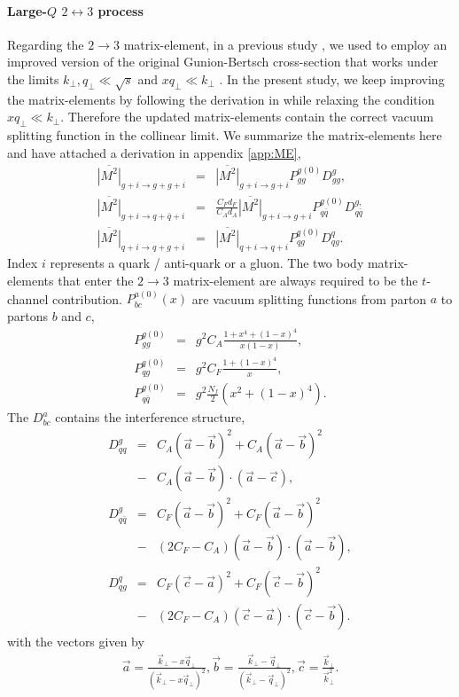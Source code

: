 \paragraph{Large-$Q$ $2\leftrightarrow 3$ process} 
Regarding the $2\rightarrow 3$ matrix-element, in a previous study \cite{Ke:2018tsh}, we used to employ an improved version of the original Gunion-Bertsch cross-section that works under the limits $k_\perp, q_\perp \ll \sqrt{s}$ and $x q_\perp \ll k_\perp$ \cite{PhysRevD.25.746,Fochler:2013epa,Uphoff:2014hza}.
In the present study, we keep improving the matrix-elements by following the derivation in \cite{Fochler:2013epa} while relaxing the condition $x q_\perp \ll k_\perp$.
Therefore the updated matrix-elements contain the correct vacuum splitting function in the collinear limit.
We summarize the matrix-elements here and have attached a derivation in appendix \ref{app:ME},
\begin{eqnarray}
\overline{|M^2|}_{g+i\rightarrow g+g+i} &=& \overline{|M^2|}_{g+i\rightarrow g+i} P_{gg}^{g(0)}  D_{gg}^{g},\\
\overline{|M^2|}_{g+i\rightarrow q+\bar{q}+i} &=& \frac{C_F d_F}{C_A d_A}\overline{|M^2|}_{g+i\rightarrow g+i} P_{q\bar{q}}^{g(0)} D_{q\bar{q}}^{g,}\\
\overline{|M^2|}_{q+i\rightarrow q+g+i} &=& \overline{|M^2|}_{q+i\rightarrow q+i} P_{qg}^{q(0)} D_{qg}^{q}.
\end{eqnarray}
Index $i$ represents a quark / anti-quark or a gluon.
The two body matrix-elements that enter the $2\rightarrow 3$ matrix-element are always required to be the $t$-channel contribution.
$P_{bc}^{a(0)}(x)$ are vacuum splitting functions from parton $a$ to partons $b$ and $c$,
\begin{eqnarray}
P_{gg}^{g(0)}  &=& g^2  C_A\frac{1+x^4+(1-x)^4}{x(1-x)},\\
P_{qg}^{q(0)} &=& g^2  C_F\frac{1+(1-x)^4}{x},\\
P_{q\bar{q}}^{g(0)} &=& g^2  \frac{N_f}{2}\left(x^2+(1-x)^4\right).
\end{eqnarray}
The $D_{bc}^{a}$ contains the interference structure,
\begin{eqnarray}
D_{qq}^{g} &=& 
C_A(\vec{a}-\vec{b})^2 + C_A(\vec{a}-\vec{b})^2 \\\nonumber
&-& C_A (\vec{a}-\vec{b})\cdot (\vec{a}-\vec{c}),
\\
D_{q\bar{q}}^{g} &=& 
C_F(\vec{a}-\vec{b})^2 + C_F(\vec{a}-\vec{b})^2 \\\nonumber
&-& (2C_F-C_A) (\vec{a}-\vec{b})\cdot (\vec{a}-\vec{b}),
\\
D_{qg}^{q} &=& 
C_F(\vec{c}-\vec{a})^2 + C_F(\vec{c}-\vec{b})^2 \\\nonumber
&-& (2C_F-C_A) (\vec{c}-\vec{a})\cdot (\vec{c}-\vec{b}).
\end{eqnarray}
with the vectors given by
\begin{eqnarray}
\vec{a} = \frac{\vec{k}_\perp - x\vec{q}_\perp}{(\vec{k}_\perp - x\vec{q}_\perp)^2},
\vec{b} = \frac{\vec{k}_\perp - \vec{q}_\perp}{(\vec{k}_\perp - \vec{q}_\perp)^2},
\vec{c} =  \frac{\vec{k}_\perp}{\vec{k}_\perp^2}.
\end{eqnarray}

